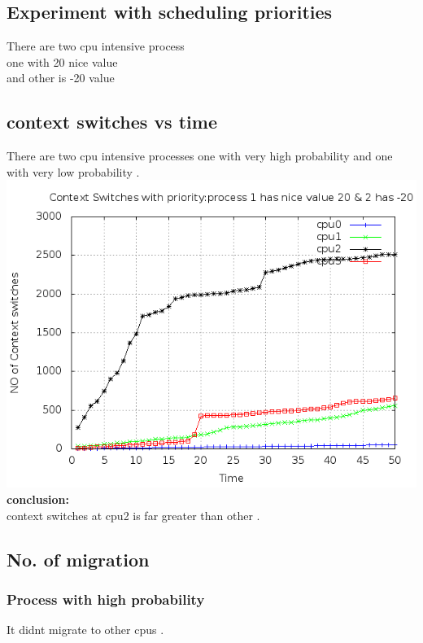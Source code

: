 \documentclass[a4paper,11pt]{report}
\begin{document}
 \subsection{Experiment with scheduling priorities}
 There are two cpu intensive process \\
 one with 20 nice value \\
 and other is -20 value\\
 \subsection{context switches vs time}
 There are two cpu intensive processes one with very high probability and one with very low probability .\\ 
 \includegraphics[scale=0.4]{priosched.png}\\
 {\bf conclusion:} \\context switches at cpu2 is far greater than other .
 \subsection{No. of migration}
  \subsubsection{Process with high probability}
  It didnt migrate to other cpus .\\
\end{document}
